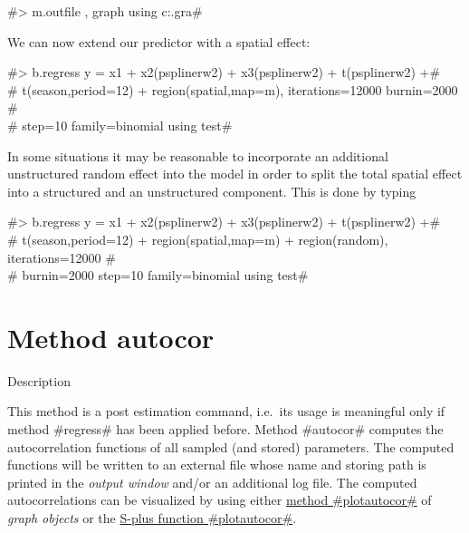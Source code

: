 #> m.outfile , graph using c:\maps\mapgraph.gra#

We can now extend our predictor with a spatial effect:

#> b.regress y = x1 + x2(psplinerw2) + x3(psplinerw2) + t(psplinerw2) +# \\
#  t(season,period=12) + region(spatial,map=m), iterations=12000 burnin=2000 #\\
#  step=10 family=binomial using test#

In some situations it may be reasonable to incorporate  an
additional unstructured  random effect into the model in order to
split the total spatial effect into a structured and an
unstructured component. This is done by typing

#> b.regress y = x1 + x2(psplinerw2) + x3(psplinerw2) + t(psplinerw2) +# \\
#  t(season,period=12) + region(spatial,map=m) + region(random), iterations=12000 #\\
#  burnin=2000 step=10 family=binomial using test#

\section{Method autocor}
\label{bayesautocorr} 
 

\begin{stanza}{Description}

This method is a post estimation command, i.e.~its usage is
meaningful only if method #regress# has been applied before. Method
#autocor# computes the autocorrelation functions of all sampled (and
stored) parameters. The computed functions will be written to an
external file whose name and storing path is printed in the {\em
output window} and/or an additional log file. The computed
autocorrelations can be visualized by using either
\hyperref[graphplotautocor]{method #plotautocor#} of {\em graph
objects} or the \hyperref[splusplotautocor]{S-plus function
#plotautocor#}.
\end{stanza}

